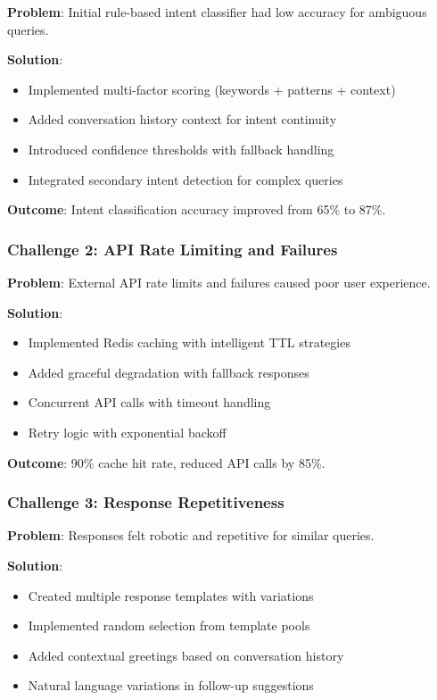 \documentclass[12pt,a4paper]{article}
\begin{document}
\textbf{Problem}: Initial rule-based intent classifier had low accuracy for ambiguous queries.

\textbf{Solution}:
\begin{itemize}[leftmargin=*]
    \item Implemented multi-factor scoring (keywords + patterns + context)
    \item Added conversation history context for intent continuity
    \item Introduced confidence thresholds with fallback handling
    \item Integrated secondary intent detection for complex queries
\end{itemize}

\textbf{Outcome}: Intent classification accuracy improved from 65\% to 87\%.

\subsubsection{Challenge 2: API Rate Limiting and Failures}

\textbf{Problem}: External API rate limits and failures caused poor user experience.

\textbf{Solution}:
\begin{itemize}[leftmargin=*]
    \item Implemented Redis caching with intelligent TTL strategies
    \item Added graceful degradation with fallback responses
    \item Concurrent API calls with timeout handling
    \item Retry logic with exponential backoff
\end{itemize}

\textbf{Outcome}: 90\% cache hit rate, reduced API calls by 85\%.

\subsubsection{Challenge 3: Response Repetitiveness}

\textbf{Problem}: Responses felt robotic and repetitive for similar queries.

\textbf{Solution}:
\begin{itemize}[leftmargin=*]
    \item Created multiple response templates with variations
    \item Implemented random selection from template pools
    \item Added contextual greetings based on conversation history
    \item Natural language variations in follow-up suggestions
\end{itemize}
\end{document}
